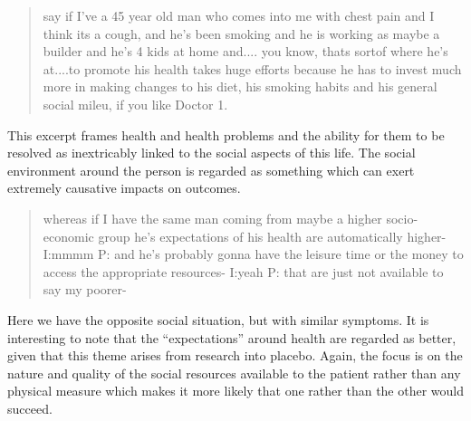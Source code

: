 \begin{quotation}
 say if I've a 45 year old man who comes into me with chest pain and I think its a cough, and he's been smoking and he is working as maybe a builder and he's 4 kids at home and.... you know, thats sortof where he's at....to promote his health takes huge efforts because he has to invest much more in making changes to his diet, his smoking habits and his general social mileu, if you like
Doctor 1.  
\end{quotation}

This excerpt frames health and health problems and the ability for them to be resolved as inextricably linked to the social aspects of this life. The social environment around the person is regarded as something which can exert extremely causative impacts on outcomes. 

\begin{quotation}
  whereas if I have the same man coming from maybe a higher socio-economic group he's expectations of his health are automatically higher-
I:mmmm
P: and he's probably gonna have the leisure time or the money to access the appropriate resources-
I:yeah
P: that are just not available to say my poorer-

\end{quotation}

Here we have the opposite social situation, but with similar symptoms. It is interesting to note that the ``expectations'' around health are regarded as better, given that this theme arises from research into placebo. Again, the focus is on the nature and quality of the social resources available to the patient rather than any physical measure which makes it more likely that one rather than the other would succeed. 

